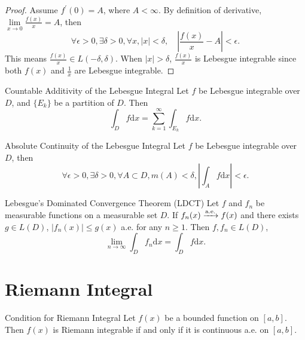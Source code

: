 \begin{proof}
  Assume $f^{\prime}(0) = A$, where $A < \infty$.
  By definition of derivative, $\lim \limits _{x \rightarrow 0} \frac{f(x)}{x} = A$,
  then
  \begin{equation}
    \forall \epsilon > 0, \exists \delta > 0, \forall x, |x| < \delta,
    \quad |\frac{f(x)}{x} - A| < \epsilon.
  \end{equation}
  This means $\frac{f(x)}{x} \in L(-\delta, \delta)$.
  When $|x| > \delta$, $\frac{f(x)}{x}$ is Lebesgue integrable since both $f(x)$ and $\frac{1}{x}$ are Lebesgue integrable.
\end{proof}

\begin{theorem}{Countable Additivity of the Lebesgue Integral}{}
  Let $f$ be Lebesgue integrable over $D$,
  and $\{E_k\}$ be a partition of $D$. Then
  \begin{equation}
    \int_D f \mathrm{d} x = \sum\limits_{k = 1}^{\infty} \int_{E_k} f \mathrm{d} x.
  \end{equation}
\end{theorem}


\begin{theorem}{Absolute Continuity of the Lebesgue Integral}{}
  Let $f$ be Lebesgue integrable over $D$,
  then
  \begin{equation}
    \forall \epsilon > 0, \exists \delta > 0, \forall A \subset D,
    m(A) < \delta, \left| \int_A f \mathrm{d} x \right| < \epsilon.
  \end{equation}
\end{theorem}


\begin{theorem}{Lebesgue's Dominated Convergence Theorem (LDCT)}{}
  Let $f$ and $f_n$ be measurable functions on a measurable set $D$.
  If $f_n(x) \xrightarrow{\text{a.e.}} f(x)$ and there exists $g \in L(D)$,
  $|f_n(x)| \leq g(x)$ a.e. for any $n \geq 1$.
  Then $f, f_n \in L(D)$,
  \begin{equation}
    \lim \limits _{n \rightarrow \infty} \int_D f_n\mathrm{d} x
    = \int_D f\mathrm{d}x.
  \end{equation}
\end{theorem}

\section{Riemann Integral}

\begin{theorem}{Condition for Riemann Integral}{}
  Let $f(x)$ be a bounded function on $[a, b]$.
  Then $f(x)$ is Riemann integrable if and only if
  it is continuous a.e. on $[a, b]$.
\end{theorem}


